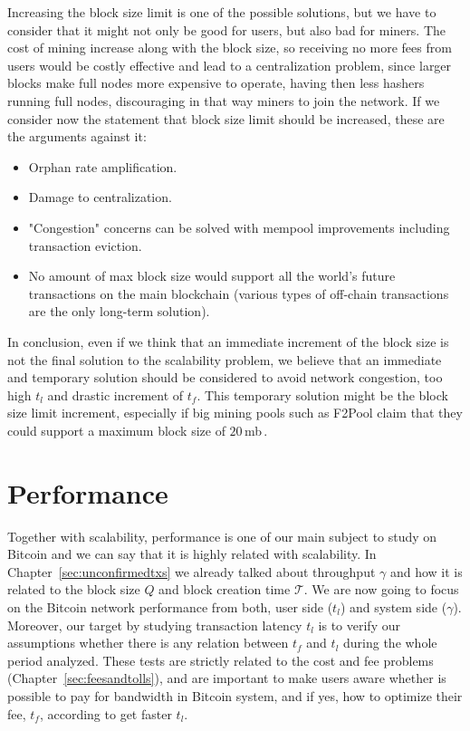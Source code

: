 \documentclass[USenglish]{uit-thesis}
\begin{document}
Increasing the block size limit is one of the possible solutions,
but we have to consider that it might not only be good
for users, but also bad for miners.
The cost of mining increase along
with the block size, so receiving
no more fees from users would be costly effective
and lead to a centralization problem, since
larger blocks make full nodes more expensive to
operate, having then less hashers running full nodes,
discouraging in that way miners to join the network.
If we consider now the statement that block size
limit should be increased, these are the
arguments against it:
\begin{itemize}
	\item Orphan rate amplification.
	\item Damage to centralization.
	\item "Congestion" concerns can be solved with mempool improvements including transaction eviction.
	\item No amount of max block size would support all the world's future transactions on the main blockchain (various types of off-chain transactions are the only long-term solution).
\end{itemize}
In conclusion, even if we think that an immediate increment of the block size
is not the final solution to the scalability problem, we believe that
an immediate and temporary solution should be considered to
avoid network congestion, too high $t_l$ and drastic increment of $t_f$.
This temporary solution
might be the block size limit increment, especially if
big mining pools such as F2Pool claim that they could support
a maximum block size of $20$\,\gls{mb}\,\cite{blocksizecontroversy}.

\section{Performance}
\label{sec:performance}
Together with scalability, performance is one of our
main subject to study on Bitcoin and we can
say that it is highly related with scalability. In
Chapter~\ref{sec:unconfirmedtxs} we already
talked about throughput $\gamma$ and how it is
related to the block size $Q$ and block creation time
$\mathcal{T}$. We are now going to focus on
the Bitcoin network
performance from both, user side ($t_l$)
and system side ($\gamma$). Moreover,
our target by studying
transaction latency $t_l$ is to verify our assumptions
whether there is any relation between $t_f$ and $t_l$
during the whole period analyzed. These tests are
strictly related to the cost and fee problems
(Chapter~\ref{sec:feesandtolls}), and are important
to make users aware whether is possible
to pay for bandwidth in Bitcoin system, and
if yes, how to optimize their fee, $t_f$, according to get
faster $t_l$.
\end{document}
